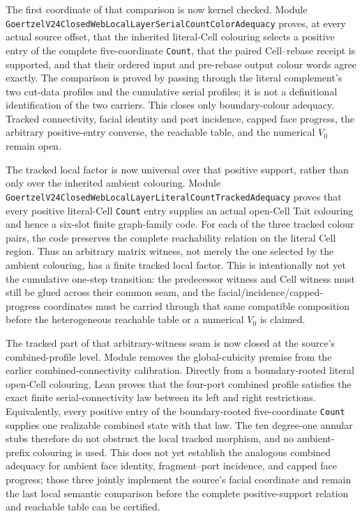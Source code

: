 \documentclass[11pt]{article}
\theoremstyle{definition}
\begin{document}
The first coordinate of that comparison is now kernel checked.  Module
\texttt{GoertzelV24ClosedWebLocalLayerSerialCountColorAdequacy} proves, at
every actual source offset, that the inherited literal-Cell colouring selects
a positive entry of the complete five-coordinate \texttt{Count}, that the
paired Cell--rebase receipt is supported, and that their ordered input and
pre-rebase output colour words agree exactly.  The comparison is proved by
passing through the literal complement's two cut-data profiles and the
cumulative serial profiles; it is not a definitional identification of the two
carriers.  This closes only boundary-colour adequacy.  Tracked connectivity,
facial identity and port incidence, capped face progress, the arbitrary
positive-entry converse, the reachable table, and the numerical $V_0$ remain
open.

The tracked local factor is now universal over that positive support, rather
than only over the inherited ambient colouring.  Module
\texttt{GoertzelV24ClosedWebLocalLayerLiteralCountTrackedAdequacy} proves that
every positive literal-Cell \texttt{Count} entry supplies an actual open-Cell
Tait colouring and hence a six-slot finite graph-family code.  For each of the
three tracked colour pairs, the code preserves the complete reachability
relation on the literal Cell region.  Thus an arbitrary matrix witness, not
merely the one selected by the ambient colouring, has a finite tracked local
factor.  This is intentionally not yet the cumulative one-step transition:
the predecessor witness and Cell witness must still be glued across their
common seam, and the facial/incidence/capped-progress coordinates must be
carried through that same compatible composition before the heterogeneous
reachable table or a numerical $V_0$ is claimed.

The tracked part of that arbitrary-witness seam is now closed at the source's
combined-profile level.  Module
removes the global-cubicity premise from the earlier combined-connectivity
calibration.  Directly from a boundary-rooted literal open-Cell colouring,
Lean proves that the four-port combined profile satisfies the exact finite
serial-connectivity law between its left and right restrictions.  Equivalently,
every positive entry of the boundary-rooted five-coordinate \texttt{Count}
supplies one realizable combined state with that law.  The ten degree-one
annular stubs therefore do not obstruct the local tracked morphism, and no
ambient-prefix colouring is used.  This does not yet establish the analogous
combined adequacy for ambient face identity, fragment--port incidence, and
capped face progress; those three jointly implement the source's facial
coordinate and remain the last local semantic comparison before the complete
positive-support relation and reachable table can be certified.
\end{document}
